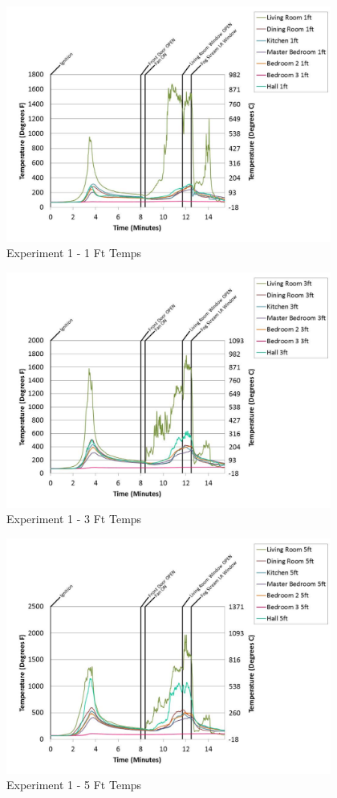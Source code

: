 \documentclass{article}
\begin{document}
\begin{appendices}
	\begin{figure}[h!]
		\centering
		\includegraphics[height=3.05in]{0_Images/Results_Charts/Exp_1_Charts/1FtTemps.pdf}
		\caption{Experiment 1 - 1 Ft Temps}
	\end{figure}
 

	\begin{figure}[h!]
		\centering
		\includegraphics[height=3.05in]{0_Images/Results_Charts/Exp_1_Charts/3FtTemps.pdf}
		\caption{Experiment 1 - 3 Ft Temps}
	\end{figure}
 
	\clearpage

	\begin{figure}[h!]
		\centering
		\includegraphics[height=3.05in]{0_Images/Results_Charts/Exp_1_Charts/5FtTemps.pdf}
		\caption{Experiment 1 - 5 Ft Temps}
	\end{figure}
 


\end{appendices}
\end{document}
